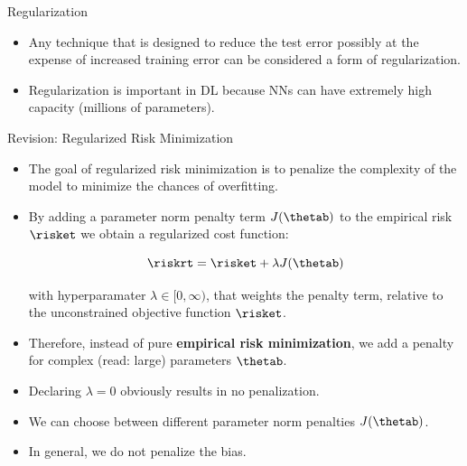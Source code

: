 






\newcommand{\Dsubtrain}{\mathcal{D}_{\text{subtrain}}}
\newcommand{\Dval}{\mathcal{D}_{\text{val}}}




\begin{frame} {Regularization}
  \begin{itemize}
    \item Any technique that is designed to reduce the test error possibly at the expense of increased training error can be considered a form of regularization.
    \item Regularization is important in DL because NNs can have extremely high capacity (millions of parameters).
  \end{itemize}
\end{frame}
\begin{vbframe}{Revision: Regularized Risk Minimization}
  \begin{itemize}
  \item The goal of regularized risk minimization is to penalize the complexity of the model to minimize the chances of overfitting.
    \item By adding a parameter norm penalty term \(J(\thetab)\) to the empirical risk $\risket$ we obtain a regularized cost function:

      $$\riskrt = \risket + \lambda \text{\(J(\thetab)\)}$$

      with hyperparamater $\lambda \in [0, \infty)$, that weights the penalty term,
      relative to the unconstrained objective function $\risket$.

    \item Therefore, instead of pure \textbf{empirical risk minimization}, we add a penalty
for complex (read: large) parameters \(\thetab\).
    \item Declaring $\lambda = 0$ obviously results in no penalization.
    \item We can choose between different parameter norm penalties \(J(\thetab)\).
    \item In general, we do not penalize the bias.
  \end{itemize}
\end{vbframe}

